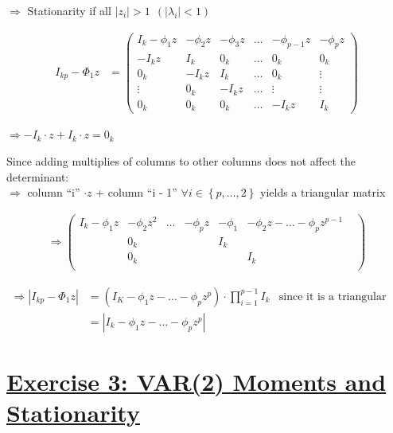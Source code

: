 \documentclass[12pt,a4paper]{article}
\newcommand{\tmpsection}[1]{}
\let\tmpsection=\section
\renewcommand{\section}[1]{\tmpsection{\underline{#1}} }
\begin{document}
\(\Rightarrow\) Stationarity if all
\(|z_i| > 1 \; \, (|\lambda_i| < 1)\)

\begin{align*}
  I_{kp} - \Phi_1 z & = 
  \begin{pmatrix}
    I_k - \phi_1 z & - \phi_2 z & - \phi_3 z & \ldots & - \phi_{p - 1} z & - \phi_{p} z \\
    - I_k z        & I_k        &  0_k       & \ldots & 0_k & 0_k \\
    0_k   & - I_k z        & I_k & \ldots & 0_k & \vdots\\
    \vdots & 0_k   & - I_k z        & \ldots & \vdots & \vdots \\
    0_k & 0_k & 0_k & \ldots &  - I_k z        & I_k
  \end{pmatrix}
\end{align*}

\(\Rightarrow -I_k \cdot z + I_k \cdot z = 0_k\)

Since adding multiplies of columns to other columns does not affect the
determinant:\\

\(\Rightarrow\) column \enquote{i} \(\cdot z\) + column \enquote{i - 1}
\(\forall i \in \left\{ p, \ldots, 2\right\}\) yields a triangular
matrix

\begin{align*}
  \Rightarrow
  \begin{pmatrix}
    I_k - \phi_1 z & - \phi_2 z^2 & \ldots & - \phi_{p} z & -\phi_1 & -\phi_2 z - \ldots -\phi_p z^{p-1}  \\
    & 0_k & & & I_k & &\\
    & 0_k & & & & I_k &\\
  \end{pmatrix}
\end{align*}

\begin{align*}
  \Rightarrow \left| I_{kp} - \Phi_1 z \right| & = \left( I_K - \phi_1 z - \ldots - \phi_p z^p \right) \cdot \prod_{i = 1}^{p-1} I_k & \text{since it is a triangular matrix}\\
  & = \left| I_k - \phi_1 z - \ldots - \phi_p z^p \right| 
\end{align*}

\hypertarget{exercise-3-var2-moments-and-stationarity}{%
\section{Exercise 3: VAR(2) Moments and
Stationarity}\label{exercise-3-var2-moments-and-stationarity}}
\end{document}
